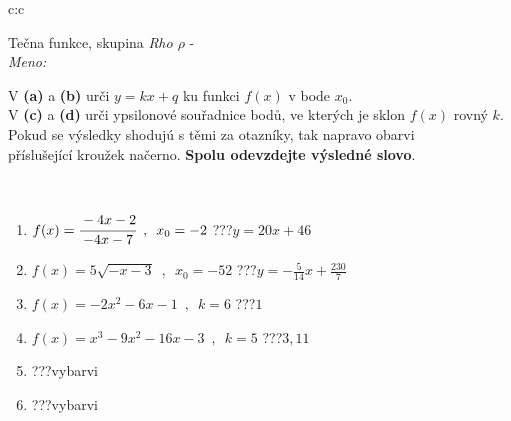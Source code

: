 \documentclass[10pt]{report}
\begin{document}
\newpage
\thispagestyle{empty}
\begin{tabular}{c:c}
\begin{minipage}[c][104.5mm][t]{0.5\linewidth}
\begin{center}
\vspace{7mm}
{\huge Tečna funkce, skupina \textit{Rho $\rho$} -}\\[5mm]
\textit{Meno:}\phantom{xxxxxxxxxxxxxxxxxxxxxxxxxxxxxxxxxxxxxxxxxxxxxxxxxxxxxxxxxxxxxxxxx}\\[5mm]
\begin{minipage}{0.95\linewidth}
\begin{center}
V \textbf{(a)} a \textbf{(b)} urči  $y = kx + q$ ku funkci $f(x)$ v bode $x_0$.\\V \textbf{(c)} a \textbf{(d)} urči ypsilonové souřadnice bodů, ve kterých je sklon $f(x)$ rovný $k$.\\Pokud se výsledky shodujú s těmi za otazníky, tak napravo obarvi\\příslušející kroužek načerno. \textbf{Spolu odevzdejte výsledné slovo}.
\end{center}
\end{minipage}
\\[1mm]
\begin{minipage}{0.79\linewidth}
\begin{center}
\begin{varwidth}{\linewidth}
\begin{enumerate}
\small
\item $f(x)=\cfrac{-4x-2}{-4x-7}\enspace , \enspace x_0=-2$\quad \dotfill\; ???\;\dotfill \quad $y = 20x+46$
\item $f(x)=5\sqrt{-x-3}\enspace , \enspace x_0=-52$\quad \dotfill\; ???\;\dotfill \quad $y = -\frac{5}{14}x+\frac{230}{7}$
\item $f(x)=-2x^2-6x-1\enspace , \enspace k=6$\quad \dotfill\; ???\;\dotfill \quad $1$
\item $f(x)=x^3-9x^2-16x-3\enspace , \enspace k=5$\quad \dotfill\; ???\;\dotfill \quad $3 , 11$
\item \quad \dotfill\; ???\;\dotfill \quad vybarvi
\item \quad \dotfill\; ???\;\dotfill \quad vybarvi
\end{enumerate}
\end{varwidth}
\end{center}
\end{minipage}
\begin{minipage}{0.20\linewidth}
\begin{center}

\end{center}
\end{minipage}
\end{center}
\end{minipage}
\end{tabular}
\end{document}
